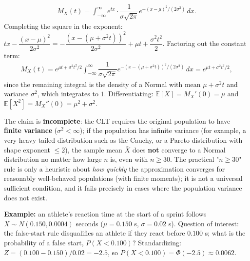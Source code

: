 \begin{solproblema}[prob:dd1e027]
	\begin{align*}
		M_X(t) = \int_{-\infty}^{\infty} e^{tx}\cdot\dfrac{1}{\sigma\sqrt{2\pi}}e^{-(x-\mu)^2/(2\sigma^2)}\,dx.
	\end{align*}
	Completing the square in the exponent: $tx - \dfrac{(x-\mu)^2}{2\sigma^2} = -\dfrac{(x-(\mu+\sigma^2t))^2}{2\sigma^2} + \mu t + \dfrac{\sigma^2t^2}{2}$. Factoring out the constant term:
	\begin{align*}
		M_X(t) = e^{\mu t+\sigma^2t^2/2}\int_{-\infty}^{\infty}\dfrac{1}{\sigma\sqrt{2\pi}}e^{-(x-(\mu+\sigma^2t))^2/(2\sigma^2)}\,dx = e^{\mu t+\sigma^2t^2/2},
	\end{align*}
	since the remaining integral is the density of a Normal with mean $\mu+\sigma^2t$ and variance $\sigma^2$, which integrates to $1$. Differentiating: $\mathbb{E}[X]=M_X'(0)=\mu$ and $\mathbb{E}[X^2]=M_X''(0)=\mu^2+\sigma^2$.
\end{solproblema}

\begin{solproblema}[prob:96d8f57]
	The claim is \textbf{incomplete}: the CLT requires the original population to have \textbf{finite variance} ($\sigma^2<\infty$); if the population has infinite variance (for example, a very heavy-tailed distribution such as the Cauchy, or a Pareto distribution with shape exponent $\le 2$), the sample mean $\bar{X}$ does \textbf{not} converge to a Normal distribution no matter how large $n$ is, even with $n\ge30$. The practical "$n\ge30$" rule is only a heuristic about \emph{how quickly} the approximation converges for reasonably well-behaved populations (with finite moments); it is not a universal sufficient condition, and it fails precisely in cases where the population variance does not exist.
\end{solproblema}

\begin{solproblema}
	\textbf{Example:} an athlete's reaction time at the start of a sprint follows $X\sim N(0.150, 0.0004)$ seconds ($\mu=0.150$ s, $\sigma=0.02$ s). Question of interest: the false-start rule disqualifies an athlete if they react before $0.100$ s; what is the probability of a false start, $P(X<0.100)$? Standardizing: $Z = (0.100-0.150)/0.02 = -2.5$, so $P(X<0.100) = \Phi(-2.5) \approx 0.0062$.
\end{solproblema}
